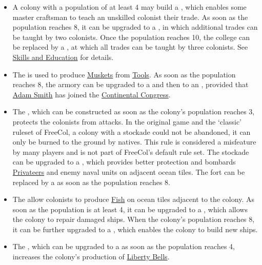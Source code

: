 \documentclass[12pt]{book}
\begin{document}
\begin{itemize}
\item A colony with a population of at least 4 may build a
  , which enables some master craftsman to teach
  an unskilled colonist their trade. As soon as the population reaches
  8, it can be upgraded to a , in which additional
  trades can be taught by two colonists. Once the population reaches
  10, the college can be replaced by a , at which
  all trades can be taught by three colonists. See \hyperlink{Skills
  and Education}{Skills and Education} for details.

\item The  is used to produce
  \hyperlink{Muskets}{Muskets} from \hyperlink{Tools}{Tools}. As soon
  as the population reaches 8, the armory can be upgraded to a
   and then to an , provided that
  \hyperlink{Adam Smith}{Adam Smith} has joined the
  \hyperlink{Continental Congress}{Continental Congress}.

\item The , which can be constructed as soon as the
  colony's population reaches 3, protects the colonists from
  attacks. In the original game and the `classic' ruleset of FreeCol,
  a colony with a stockade could not be abandoned, it can only be
  burned to the ground by natives. This rule is considered a
  misfeature by many players and is not part of FreeCol's default rule
  set. The stockade can be upgraded to a , which
  provides better protection and bombards
  \hyperlink{Privateer}{Privateers} and enemy naval units on adjacent
  ocean tiles. The fort can be replaced by a  as
  soon as the population reaches 8.

\item The  allow colonists to produce
  \hyperlink{Fish}{Fish} on ocean tiles adjacent to the colony. As
  soon as the population is at least 4, it can be upgraded to a
  , which allows the colony to repair damaged
  ships. When the colony's population reaches 8, it can be further
  upgraded to a , which enables the colony to build
  new ships.

\item The , which can be upgraded to a
   as soon as the population reaches 4, increases
  the colony's production of \hyperlink{Liberty Bells}{Liberty Bells}.


\end{itemize}
\end{document}
